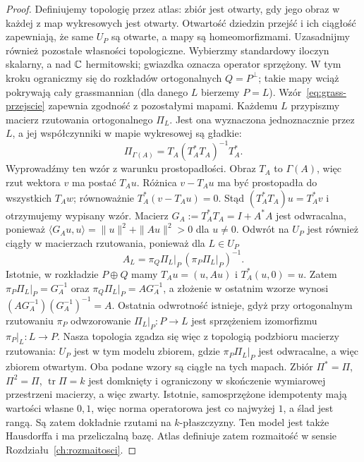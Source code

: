 \begin{proof}
Definiujemy topologię przez atlas: zbiór jest otwarty, gdy
jego obraz w każdej z map wykresowych jest otwarty.
Otwartość dziedzin przejść i ich ciągłość zapewniają, że
same $U_P$ są otwarte, a mapy są homeomorfizmami.
Uzasadnijmy również pozostałe własności topologiczne.
Wybierzmy standardowy iloczyn skalarny, a nad $\mathbb{C}$ hermitowski;
gwiazdka oznacza operator sprzężony. W tym kroku
ograniczmy się do rozkładów ortogonalnych $Q=P^\perp$;
takie mapy wciąż pokrywają cały grassmannian
(dla danego $L$ bierzemy $P=L$).
Wzór~\eqref{eq:grass-przejscie} zapewnia zgodność
z pozostałymi mapami. Każdemu $L$
przypiszmy macierz rzutowania ortogonalnego $\Pi_L$.
Jest ona wyznaczona jednoznacznie przez $L$, a jej
współczynniki w mapie wykresowej są gładkie:
\[
 \Pi_{\Gamma(A)}
  =T_A(T_A^*T_A)^{-1}T_A^*.
\]
Wyprowadźmy ten wzór z warunku prostopadłości.
Obraz $T_A$ to $\Gamma(A)$, więc rzut wektora $v$ ma postać
$T_Au$. Różnica $v-T_Au$ ma być prostopadła do wszystkich
$T_Aw$; równoważnie $T_A^*(v-T_Au)=0$.
Stąd $(T_A^*T_A)u=T_A^*v$ i otrzymujemy wypisany wzór.
Macierz $G_A:=T_A^*T_A=I+A^*A$ jest odwracalna, ponieważ
$\langle G_Au,u\rangle=\|u\|^2+\|Au\|^2>0$ dla $u\ne0$.
Odwrót na $U_P$ jest również ciągły w macierzach
rzutowania, ponieważ dla $L\in U_P$
\[
 A_L=\pi_Q\Pi_L|_P\,(\pi_P\Pi_L|_P)^{-1}.
\]
Istotnie, w rozkładzie $P\oplus Q$ mamy
$T_Au=(u,Au)$ i $T_A^*(u,0)=u$.
Zatem $\pi_P\Pi_L|_P=G_A^{-1}$ oraz
$\pi_Q\Pi_L|_P=AG_A^{-1}$, a złożenie w ostatnim wzorze
wynosi $(AG_A^{-1})(G_A^{-1})^{-1}=A$.
Ostatnia odwrotność istnieje, gdyż przy ortogonalnym
rzutowaniu $\pi_P$ odwzorowanie $\Pi_L|_P:P\to L$
jest sprzężeniem izomorfizmu
$\pi_P|_L:L\to P$. Nasza topologia zgadza się więc
z topologią podzbioru macierzy rzutowania: $U_P$ jest w tym
modelu zbiorem, gdzie $\pi_P\Pi_L|_P$ jest odwracalne,
a więc zbiorem otwartym. Oba podane wzory są ciągłe na tych mapach.
Zbiór $\Pi^*=\Pi$, $\Pi^2=\Pi$, $\operatorname{tr}\Pi=k$
jest domknięty i ograniczony w skończenie wymiarowej
przestrzeni macierzy, a więc zwarty. Istotnie, samosprzężone
idempotenty mają wartości własne $0,1$, więc norma operatorowa
jest co najwyżej $1$, a ślad jest rangą. Są zatem dokładnie
rzutami na $k$-płaszczyzny. Ten model jest także
Hausdorffa i ma przeliczalną bazę. Atlas definiuje
zatem rozmaitość w sensie Rozdziału~\ref{ch:rozmaitosci}.
\end{proof}


